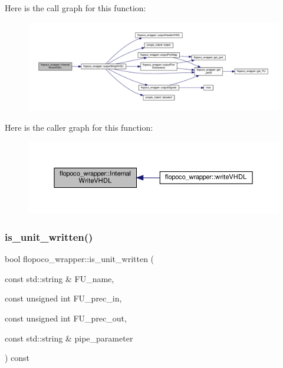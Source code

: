 Here is the call graph for this function\+:
\nopagebreak
\begin{figure}[H]
\begin{center}
\leavevmode
\includegraphics[width=350pt]{d7/dbf/classflopoco__wrapper_afc229ae93b5772fadc22ead428f29036_cgraph}
\end{center}
\end{figure}
Here is the caller graph for this function\+:
\nopagebreak
\begin{figure}[H]
\begin{center}
\leavevmode
\includegraphics[width=350pt]{d7/dbf/classflopoco__wrapper_afc229ae93b5772fadc22ead428f29036_icgraph}
\end{center}
\end{figure}
\mbox{\label{classflopoco__wrapper_ac7bd64c1720604606984f0f020fdbf54}} 
\subsubsection{\texorpdfstring{is\+\_\+unit\+\_\+written()}{is\_unit\_written()}}
{\footnotesize\ttfamily bool flopoco\+\_\+wrapper\+::is\+\_\+unit\+\_\+written (\begin{DoxyParamCaption}\item[{const std\+::string \&}]{F\+U\+\_\+name,  }\item[{const unsigned int}]{F\+U\+\_\+prec\+\_\+in,  }\item[{const unsigned int}]{F\+U\+\_\+prec\+\_\+out,  }\item[{const std\+::string \&}]{pipe\+\_\+parameter }\end{DoxyParamCaption}) const\hspace{0.3cm}{\ttfamily [inline]}}



